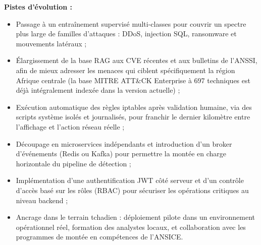 \documentclass[12pt,a4paper]{report}
\begin{document}
\begin{onehalfspace}
\textbf{Pistes d'évolution :}
\begin{itemize}
  \item[\ding{43}] Passage à un entraînement supervisé multi-classes pour
  couvrir un spectre plus large de familles d'attaques : DDoS, injection SQL,
  ransomware et mouvements latéraux ;
  \item[\ding{43}] Élargissement de la base RAG aux CVE récentes et aux
  bulletins de l'ANSSI, afin de mieux adresser les menaces qui ciblent
  spécifiquement la région Afrique centrale (la base MITRE ATT\&CK Enterprise
  à 697 techniques est déjà intégralement indexée dans la version actuelle) ;
  \item[\ding{43}] Exécution automatique des règles iptables après
  validation humaine, via des scripts système isolés et journalisés, pour
  franchir le dernier kilomètre entre l'affichage et l'action réseau réelle ;
  \item[\ding{43}] Découpage en microservices indépendants et introduction
  d'un broker d'événements (Redis ou Kafka) pour permettre la montée en
  charge horizontale du pipeline de détection ;
  \item[\ding{43}] Implémentation d'une authentification JWT côté serveur
  et d'un contrôle d'accès basé sur les rôles (RBAC) pour sécuriser les
  opérations critiques au niveau backend ;
  \item[\ding{43}] Ancrage dans le terrain tchadien : déploiement pilote dans
  un environnement opérationnel réel, formation des analystes locaux, et
  collaboration avec les programmes de montée en compétences de l'ANSICE.
\end{itemize}
\end{onehalfspace}

\newpage
\end{document}
